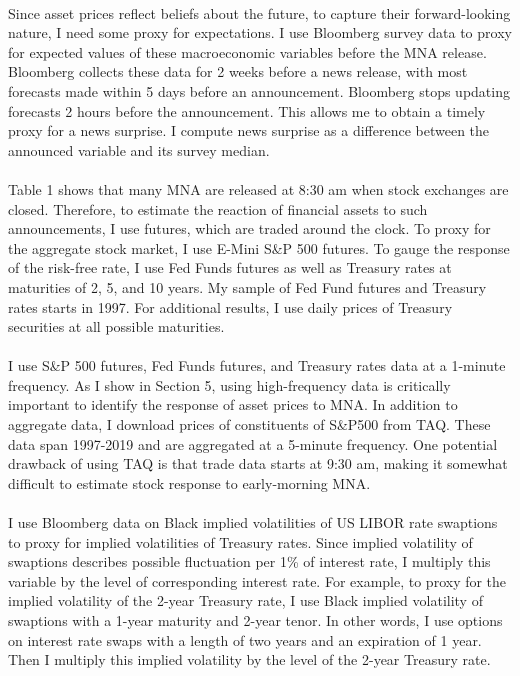 \documentclass[12pt]{article}
\begin{document}
\paragraph{}
Since asset prices reflect beliefs about the future, to capture their forward-looking nature, I need some proxy for expectations. I use Bloomberg survey data to proxy for expected values of these macroeconomic variables before the MNA release. Bloomberg collects these data for 2 weeks before a news release, with most forecasts made within 5 days before an announcement. Bloomberg stops updating forecasts 2 hours before the announcement. This allows me to obtain a timely proxy for a news surprise. I compute news surprise as a difference between the announced variable and its survey median.
\paragraph{}
Table 1 shows that many MNA are released at 8:30 am when stock exchanges are closed. Therefore, to estimate the reaction of financial assets to such announcements, I use futures, which are traded around the clock. To proxy for the aggregate stock market, I use E-Mini S\&P 500 futures. To gauge the response of the risk-free rate, I use Fed Funds futures as well as Treasury rates at maturities of 2, 5, and 10 years. My sample of Fed Fund futures and Treasury rates starts in 1997. For additional results, I use daily prices of Treasury securities at all possible maturities.
\paragraph{}
I use S\&P 500 futures, Fed Funds futures, and Treasury rates data at a 1-minute frequency. As I show in Section 5, using high-frequency data is critically important to identify the response of asset prices to MNA. In addition to aggregate data, I download prices of constituents of S\&P500 from TAQ. These data span 1997-2019 and are aggregated at a 5-minute frequency. One potential drawback of using TAQ is that trade data starts at 9:30 am, making it somewhat difficult to estimate stock response to early-morning MNA.
\paragraph{}
I use Bloomberg data on Black implied volatilities of US LIBOR rate swaptions to proxy for implied volatilities of Treasury rates. Since implied volatility of swaptions describes possible fluctuation per 1\% of interest rate, I multiply this variable by the level of corresponding interest rate. For example, to proxy for the implied volatility of the 2-year Treasury rate, I use Black implied volatility of swaptions with a 1-year maturity and 2-year tenor. In other words, I use options on interest rate swaps with a length of two years and an expiration of 1 year. Then I multiply this implied volatility by the level of the 2-year Treasury rate. 
\end{document}
